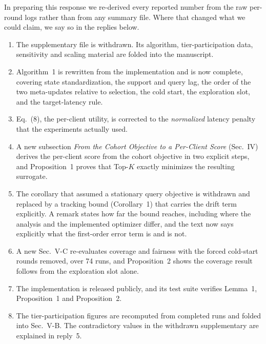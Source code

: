\documentclass[10pt]{article}
\begin{document}
In preparing this response we re-derived every reported number from the raw per-round logs rather than from any summary file. Where that changed what we could claim, we say so in the replies below.

\vspace{1em}

\begin{enumerate}[leftmargin=2.2em,itemsep=0.25em]
\item The supplementary file is withdrawn. Its algorithm, tier-participation data, sensitivity and scaling material are folded into the manuscript.
\item Algorithm~1 is rewritten from the implementation and is now complete, covering state standardization, the support and query lag, the order of the two meta-updates relative to selection, the cold start, the exploration slot, and the target-latency rule.
\item Eq.~(8), the per-client utility, is corrected to the \emph{normalized} latency penalty that the experiments actually used.
\item A new subsection \emph{From the Cohort Objective to a Per-Client Score} (Sec.~IV) derives the per-client score from the cohort objective in two explicit steps, and Proposition~1 proves that Top-$K$ exactly minimizes the resulting surrogate.
\item The corollary that assumed a stationary query objective is withdrawn and replaced by a tracking bound (Corollary~1) that carries the drift term explicitly. A remark states how far the bound reaches, including where the analysis and the implemented optimizer differ, and the text now says explicitly what the first-order error term is and is not.
\item A new Sec.~V-C re-evaluates coverage and fairness with the forced cold-start rounds removed, over 74 runs, and Proposition~2 shows the coverage result follows from the exploration slot alone.
\item The implementation is released publicly, and its test suite verifies Lemma~1, Proposition~1 and Proposition~2.
\item The tier-participation figures are recomputed from completed runs and folded into Sec.~V-B. The contradictory values in the withdrawn supplementary are explained in reply~5.
\end{enumerate}

\vspace{1em}
\end{document}
